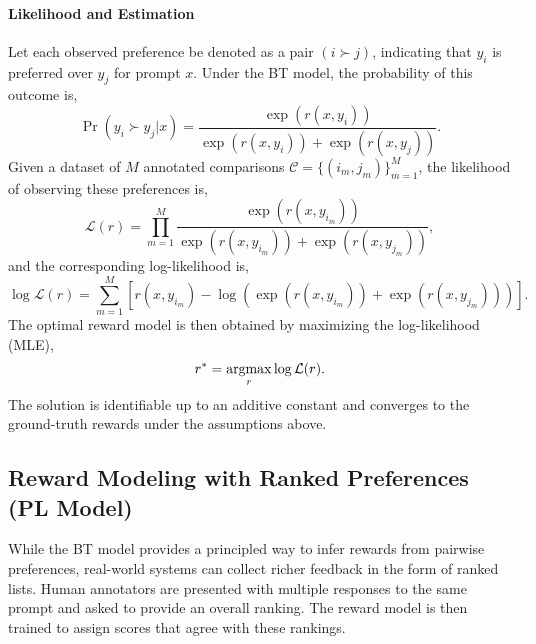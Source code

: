 \paragraph{Likelihood and Estimation}
Let each observed preference be denoted as a pair $(i \succ j)$, indicating that $y_i$ is preferred over $y_j$ for prompt $x$. Under the BT model, the probability of this outcome is,
\begin{equation}
    \Pr(y_i \succ y_j | x) = \frac{\exp(r(x, y_i))}{\exp(r(x, y_i)) + \exp(r(x, y_j))}.
\end{equation}
Given a dataset of $M$ annotated comparisons $\mathcal{C} = \{(i_m, j_m)\}_{m=1}^M$, the likelihood of observing these preferences is,
\begin{equation}
    \mathcal{L}(r) = \prod_{m=1}^M \frac{\exp(r(x, y_{i_m}))}{\exp(r(x, y_{i_m})) + \exp(r(x, y_{j_m}))},
\end{equation}
and the corresponding log-likelihood is,
\begin{equation}
    \log \mathcal{L}(r) = \sum_{m=1}^M \left[ r(x, y_{i_m}) - \log\left(\exp(r(x, y_{i_m})) + \exp(r(x, y_{j_m}))\right) \right].
\end{equation}
The optimal reward model is then obtained by maximizing the log-likelihood (MLE),
\begin{equation}
    r^* = \operatorname*{argmax}_r \log \mathcal{L}(r).
\end{equation}
The solution is identifiable up to an additive constant and converges to the ground-truth rewards under the assumptions above.

\subsection{Reward Modeling with Ranked Preferences (PL Model)}

While the BT model provides a principled way to infer rewards from pairwise preferences, real-world systems can collect richer feedback in the form of ranked lists. Human annotators are presented with multiple responses to the same prompt and asked to provide an overall ranking. The reward model is then trained to assign scores that agree with these rankings.

